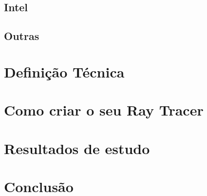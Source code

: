 \documentclass[journal]{IEEEtran}
\begin{document}
\subsection{Intel}


\subsection{Outras}


\section{Definição Técnica}

\section{Como criar o seu Ray Tracer}

\section{Resultados de estudo}

\section{Conclusão}




\end{document}
